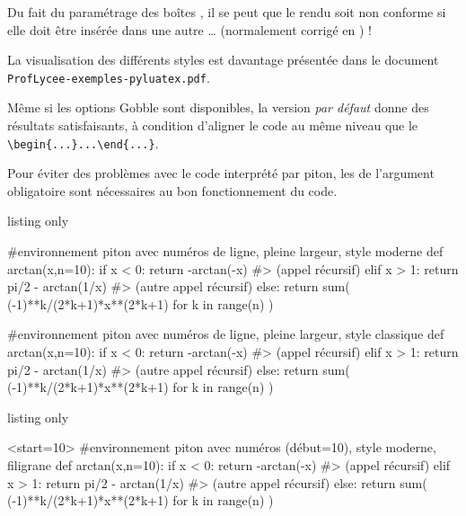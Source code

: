 \begin{noteblock}
Du fait du paramétrage des boîtes , il se peut que le rendu soit non conforme si elle doit être insérée dans une autre \ldots{} (normalement corrigé en ) !

\smallskip

La visualisation des différents styles est davantage présentée dans le document \texttt{ProfLycee-exemples-pyluatex.pdf}.
\end{noteblock}

\begin{warningblock}
Même si les options \textsf{Gobble} sont disponibles, la version \textit{par défaut} donne des résultats satisfaisants, à condition d'aligner le code au même niveau que le \verb*|\begin{...}...\end{...}|.
\end{warningblock}

\begin{noteblock}
Pour éviter des problèmes avec le code interprété par \textsf{piton}, les \ctex{\{\}} de l'argument obligatoire sont nécessaires au bon fonctionnement du code.
\end{noteblock}

\begin{PresCodeTexPL}{listing only}
\begin{CodePiton}{} %
#environnement piton avec numéros de ligne, pleine largeur, style moderne
def arctan(x,n=10):
	if x < 0:
		return -arctan(-x) #> (appel récursif)
	elif x > 1:
		return pi/2 - arctan(1/x) #> (autre appel récursif)
	else:
		return sum( (-1)**k/(2*k+1)*x**(2*k+1) for k in range(n) )
\end{CodePiton}
\end{PresCodeTexPL}

\begin{CodePiton}{}
#environnement piton avec numéros de ligne, pleine largeur, style classique
def arctan(x,n=10):
	if x < 0:
		return -arctan(-x) #> (appel récursif)
	elif x > 1:
		return pi/2 - arctan(1/x) #> (autre appel récursif)
	else:
		return sum( (-1)**k/(2*k+1)*x**(2*k+1) for k in range(n) )
\end{CodePiton}

\begin{PresCodeTexPL}{listing only}
\begin{CodePiton}[Style=Moderne,Filigrane]{}<start=10>
#environnement piton avec numéros (début=10), style moderne, filigrane
def arctan(x,n=10):
	if x < 0:
		return -arctan(-x) #> (appel récursif)
	elif x > 1:
		return pi/2 - arctan(1/x) #> (autre appel récursif)
	else:
		return sum( (-1)**k/(2*k+1)*x**(2*k+1) for k in range(n) )
\end{CodePiton}
\end{PresCodeTexPL}


